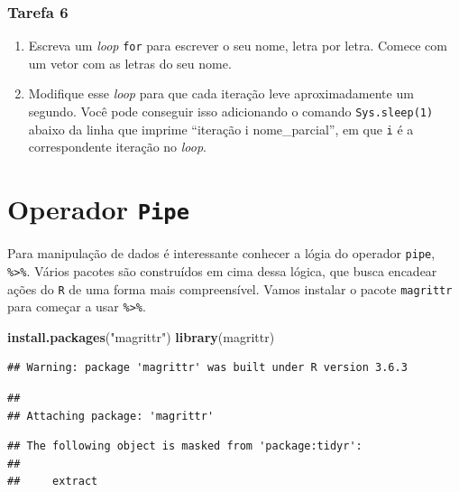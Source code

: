 \documentclass[
]{book}
\newenvironment{Shaded}{\begin{snugshade}}{\end{snugshade}}
\newcommand{\KeywordTok}[1]{\textcolor[rgb]{0.13,0.29,0.53}{\textbf{#1}}}
\newcommand{\NormalTok}[1]{#1}
\newcommand{\StringTok}[1]{\textcolor[rgb]{0.31,0.60,0.02}{#1}}
\providecommand{\tightlist}{%
  \setlength{\itemsep}{0pt}\setlength{\parskip}{0pt}}
\theoremstyle{definition}
\theoremstyle{definition}
\theoremstyle{definition}
\theoremstyle{remark}
\begin{document}
\hypertarget{tarefa-6}{%
\subsubsection*{Tarefa 6}\label{tarefa-6}}

\begin{enumerate}
\def\labelenumi{\arabic{enumi}.}
\tightlist
\item
  Escreva um \emph{loop} \texttt{for} para escrever o seu nome, letra por letra. Comece com um vetor com as letras do seu nome.
\item
  Modifique esse \emph{loop} para que cada iteração leve aproximadamente um segundo. Você pode conseguir isso adicionando o comando \texttt{Sys.sleep(1)} abaixo da linha que imprime ``iteração i nome\_parcial'', em que \texttt{i} é a correspondente iteração no \emph{loop}.
\end{enumerate}

\hypertarget{operador-pipe}{%
\section{\texorpdfstring{Operador \texttt{Pipe}}{Operador Pipe}}\label{operador-pipe}}

Para manipulação de dados é interessante conhecer a lógia do operador \texttt{pipe}, \texttt{\%\textgreater{}\%}. Vários pacotes são construídos em cima dessa lógica, que busca encadear ações do \texttt{R} de uma forma mais compreensível. Vamos instalar o pacote \texttt{magrittr} para começar a usar \texttt{\%\textgreater{}\%}.

\begin{Shaded}
\begin{Highlighting}[]
\KeywordTok{install.packages}\NormalTok{(}\StringTok{"magrittr"}\NormalTok{)}
\KeywordTok{library}\NormalTok{(magrittr)}
\end{Highlighting}
\end{Shaded}

\begin{verbatim}
## Warning: package 'magrittr' was built under R version 3.6.3
\end{verbatim}

\begin{verbatim}
## 
## Attaching package: 'magrittr'
\end{verbatim}

\begin{verbatim}
## The following object is masked from 'package:tidyr':
## 
##     extract
\end{verbatim}
\end{document}
